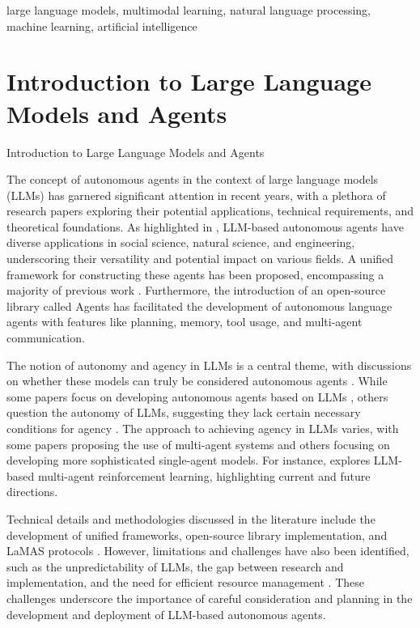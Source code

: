 \documentclass[conference]{IEEEtran}
\begin{document}
\begin{IEEEkeywords}
large language models, multimodal learning, natural language processing, machine learning, artificial intelligence
\end{IEEEkeywords}


\section{Introduction to Large Language Models and Agents}
Introduction to Large Language Models and Agents

The concept of autonomous agents in the context of large language models (LLMs) has garnered significant attention in recent years, with a plethora of research papers exploring their potential applications, technical requirements, and theoretical foundations. As highlighted in \cite{2308.11432}, LLM-based autonomous agents have diverse applications in social science, natural science, and engineering, underscoring their versatility and potential impact on various fields. A unified framework for constructing these agents has been proposed, encompassing a majority of previous work \cite{2308.11432}. Furthermore, the introduction of an open-source library called Agents \cite{2309.07870} has facilitated the development of autonomous language agents with features like planning, memory, tool usage, and multi-agent communication.

The notion of autonomy and agency in LLMs is a central theme, with discussions on whether these models can truly be considered autonomous agents \cite{2407.10735}. While some papers focus on developing autonomous agents based on LLMs \cite{2308.11432, 2411.14033}, others question the autonomy of LLMs, suggesting they lack certain necessary conditions for agency \cite{2407.10735}. The approach to achieving agency in LLMs varies, with some papers proposing the use of multi-agent systems \cite{2411.14033} and others focusing on developing more sophisticated single-agent models. For instance, \cite{2405.11106} explores LLM-based multi-agent reinforcement learning, highlighting current and future directions.

Technical details and methodologies discussed in the literature include the development of unified frameworks, open-source library implementation, and LaMAS protocols \cite{2308.11432, 2309.07870, 2411.14033}. However, limitations and challenges have also been identified, such as the unpredictability of LLMs, the gap between research and implementation, and the need for efficient resource management \cite{2407.20859, 2405.11106, 2404.13501}. These challenges underscore the importance of careful consideration and planning in the development and deployment of LLM-based autonomous agents.
\end{document}
